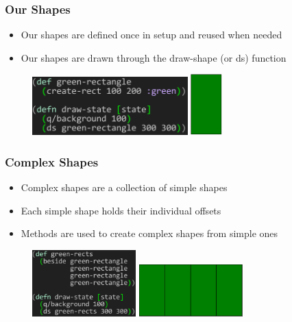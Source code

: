 \documentclass{beamer}
\begin{document}
\begin{frame}
\frametitle{Our Shapes}
	\begin{itemize}
		\item Our shapes are defined once in setup and reused when needed
		\item Our shapes are drawn through the draw-shape (or ds) function
	\end{itemize}
	\begin{figure}
		\includegraphics[width=6cm]{PresentationImages/fcsGreenRect.png}
		\hspace{1cm}
		\includegraphics[width=1.2cm]{PresentationImages/greenRectangle.png}
	\end{figure}
\end{frame}

\begin{frame}
\frametitle{Complex Shapes}
	\begin{itemize}
		\item Complex shapes are a collection of simple shapes
		\item Each simple shape holds their individual offsets
		\item Methods are used to create complex shapes from simple ones
	\end{itemize}
	\begin{figure}
	\includegraphics[width=4cm]{PresentationImages/fcsGreenRects.png}
	\hspace{1cm}
	\includegraphics[width=4cm]{PresentationImages/4GreenRects.png}
	\end{figure}
\end{frame}
\end{document}
